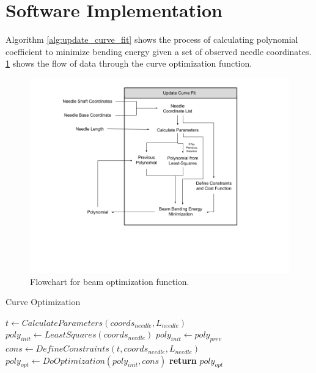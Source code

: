 

\section{Software Implementation}
Algorithm \ref{alg:update_curve_fit} shows the process of calculating polynomial coefficient to minimize bending energy given a set of observed needle coordinates. \ref{fig:curve_fit_flow} shows the flow of data through the curve optimization function. 

\begin{figure}[h]
\includegraphics[width=1.0\textwidth]{Fig/chap3/Update_Curve_Fit.png}
\caption{Flowchart for beam optimization function.}
\label{fig:curve_fit_flow}
\end{figure}

\begin{algorithm}
\caption{Curve Optimization}
\label{alg:update_curve_fit}
\begin{algorithmic}[1]
\State $t \gets CalculateParameters(coords_{needle}, L_{needle})$
	\State $poly_{init} \gets LeastSquares(coords_{needle})$
\Else
	\State $poly_{init} \gets poly_{prev}$
\EndIf
\State $cons \leftarrow DefineConstraints(t, coords_{needle}, L_{needle})$
\State $poly_{opt} \gets DoOptimization(poly_{init}, cons)$
\State \textbf{return} $poly_{opt}$
\EndProcedure
\end{algorithmic}
\end{algorithm}

